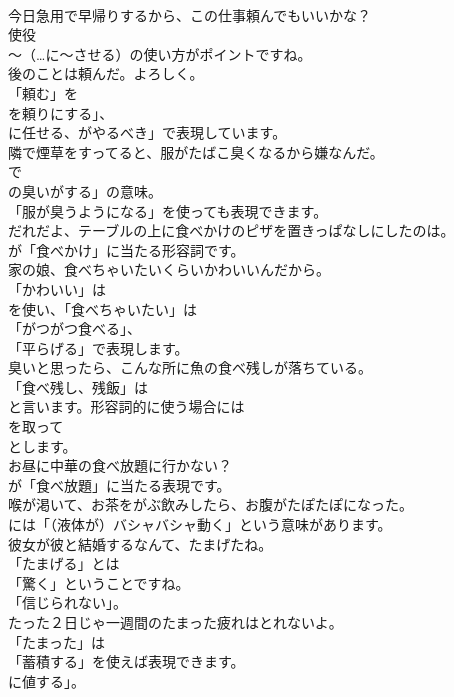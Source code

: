 \documentclass[8pt]{extreport}
\begin{document}
\begin{CJK}{UTF8}{min}
\\	今日急用で早帰りするから、この仕事頼んでもいいかな？ 
\\	使役
\\	～（…に～させる）の使い方がポイントですね。	
\\	後のことは頼んだ。よろしく。 
\\	「頼む」を
\\	を頼りにする」、
\\	に任せる、がやるべき」で表現しています。	
\\	隣で煙草をすってると、服がたばこ臭くなるから嫌なんだ。 
\\	で
\\	の臭いがする」の意味。
\\	「服が臭うようになる」を使っても表現できます。	
\\	だれだよ、テーブルの上に食べかけのピザを置きっぱなしにしたのは。 
\\	が「食べかけ」に当たる形容詞です。	
\\	家の娘、食べちゃいたいくらいかわいいんだから。 
\\	「かわいい」は
\\	を使い、「食べちゃいたい」は
\\	「がつがつ食べる」、
\\	「平らげる」で表現します。	
\\	臭いと思ったら、こんな所に魚の食べ残しが落ちている。 
\\	「食べ残し、残飯」は
\\	と言います。形容詞的に使う場合には
\\	を取って
\\	とします。	
\\	お昼に中華の食べ放題に行かない？ 
\\	が「食べ放題」に当たる表現です。	
\\	喉が渇いて、お茶をがぶ飲みしたら、お腹がたぽたぽになった。 
\\	には「（液体が）バシャバシャ動く」という意味があります。	
\\	彼女が彼と結婚するなんて、たまげたね。 
\\	「たまげる」とは
\\	「驚く」ということですね。
\\	「信じられない」。	
\\	たった２日じゃ一週間のたまった疲れはとれないよ。 
\\	「たまった」は
\\	「蓄積する」を使えば表現できます。
\\	に値する」。	

\end{CJK}
\end{document}
